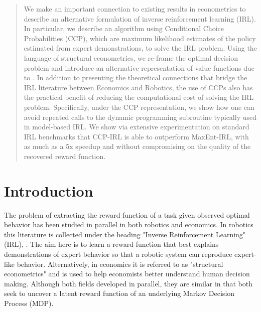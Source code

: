 \documentclass{article}
\begin{document}
\begin{abstract}
We make an important connection to existing results in econometrics to describe an alternative formulation of inverse reinforcement learning (IRL). In particular, we describe an algorithm using Conditional Choice Probabilities (CCP), which are maximum likelihood estimates of the policy estimated from expert demonstrations, to solve the IRL problem. Using the language of structural econometrics, we re-frame the optimal decision problem and introduce an alternative representation of value functions due to \cite{hotz}. In addition to presenting the theoretical connections that bridge the IRL literature between Economics and Robotics, the use of CCPs also has the practical benefit of reducing the computational cost of solving the IRL problem. Specifically, under the CCP representation, we show how one can avoid repeated calls to the dynamic programming subroutine typically used in model-based IRL. 
We show via extensive experimentation on standard IRL benchmarks that CCP-IRL is able to outperform MaxEnt-IRL, with as much as a 5x speedup and without compromising on the quality of the recovered reward function.

\end{abstract} 

\section{Introduction}

The problem of extracting the reward function of a task given observed optimal behavior has been studied in parallel in both robotics and economics. In robotics this literature is collected under the heading "Inverse Reinforcement Learning" (IRL), \cite{Ng2000, abbeel2004apprenticeship}. The aim here is to learn a reward function that best explains demonstrations of expert behavior so that a robotic system can reproduce expert-like behavior. Alternatively, in economics it is referred to as "structural econometrics" \cite{miller, pakes, rust_gmc} and is used to help economists better understand human decision making. 
Although both fields developed in parallel, they are similar in that both seek to uncover a latent reward function of an underlying Markov Decision Process (MDP).
\end{document}
